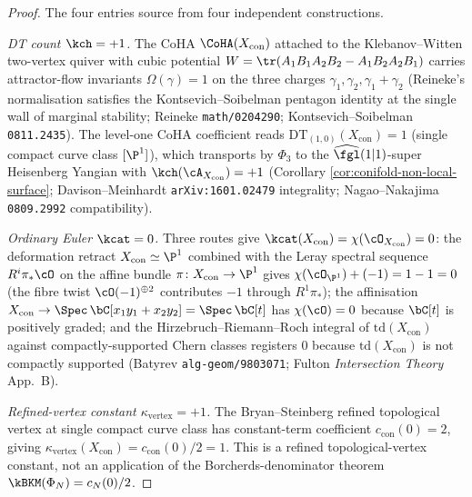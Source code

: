 \begin{proof}
The four entries source from four independent constructions.

\emph{DT count $\kch = +1$.} The CoHA $\CoHA(X_{\mathrm{con}})$ attached
to the Klebanov--Witten two-vertex quiver with cubic potential
$W = \tr(A_1 B_1 A_2 B_2 - A_1 B_2 A_2 B_1)$ carries attractor-flow
invariants $\Omega(\gamma) = 1$ on the three charges
$\gamma_1, \gamma_2, \gamma_1 + \gamma_2$ (Reineke's normalisation
satisfies the Kontsevich--Soibelman pentagon identity at the single
wall of marginal stability; Reineke \texttt{math/0204290};
Kontsevich--Soibelman \texttt{0811.2435}). The level-one CoHA
coefficient reads $\mathrm{DT}_{(1, 0)}(X_{\mathrm{con}}) = 1$
(single compact curve class $[\P^1]$), which transports by $\Phi_3$ to
the $\widehat{\fgl}(1\vert 1)$-super Heisenberg Yangian with
$\kch(\cA_{X_{\mathrm{con}}}) = +1$ (Corollary
\ref{cor:conifold-non-local-surface}; Davison--Meinhardt
\texttt{arXiv:1601.02479} integrality; Nagao--Nakajima
\texttt{0809.2992} compatibility).

\emph{Ordinary Euler $\kcat = 0$.} Three routes give
$\kcat(X_{\mathrm{con}}) = \chi(\cO_{X_{\mathrm{con}}}) = 0$: the
deformation retract $X_{\mathrm{con}} \simeq \P^1$ combined with the
Leray spectral sequence $R^i \pi_* \cO$ on the affine bundle
$\pi \colon X_{\mathrm{con}} \to \P^1$ gives
$\chi(\cO_{\P^1}) + (-1) = 1 - 1 = 0$ \textup{(}the fibre twist
$\cO(-1)^{\oplus 2}$ contributes $-1$ through $R^1 \pi_*$\textup{)};
the affinisation
$X_{\mathrm{con}} \to \Spec\, \bC[x_1 y_1 + x_2 y_2] = \Spec\, \bC[t]$
has $\chi(\cO) = 0$ because $\bC[t]$ is positively graded; and the
Hirzebruch--Riemann--Roch integral of $\mathrm{td}(X_{\mathrm{con}})$
against compactly-supported Chern classes registers $0$ because
$\mathrm{td}(X_{\mathrm{con}})$ is not compactly supported
\textup{(}Batyrev \texttt{alg-geom/9803071}; Fulton
\emph{Intersection Theory} App.~B\textup{)}.

\emph{Refined-vertex constant $\kappa_{\mathrm{vertex}} = +1$.} The Bryan--Steinberg refined
topological vertex at single compact curve class has constant-term
coefficient $c_{\mathrm{con}}(0) = 2$, giving
\(\kappa_{\mathrm{vertex}}(X_{\mathrm{con}})=c_{\mathrm{con}}(0)/2=1\).
This is a refined topological-vertex constant, not an application of
the Borcherds-denominator theorem
\(\kBKM(\Phi_N)=c_N(0)/2\).


\end{proof}
